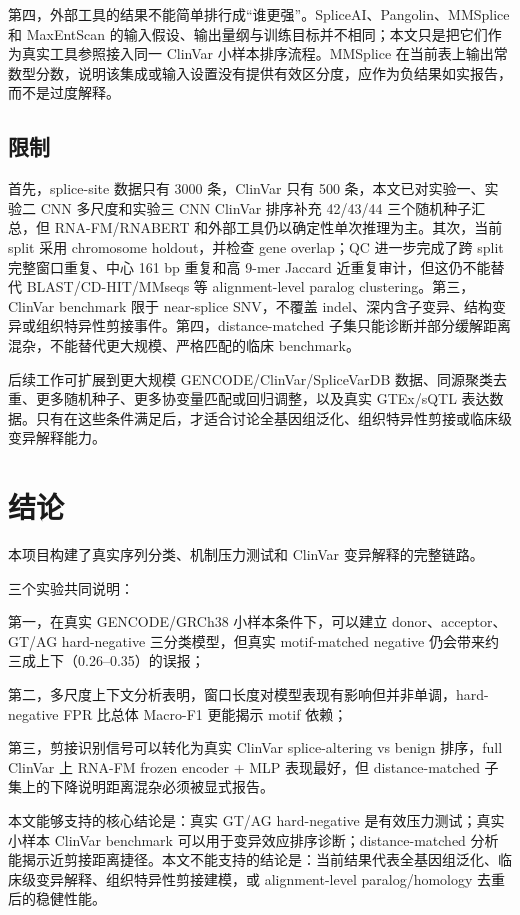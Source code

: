 \documentclass[
    oneside,
    fontset = win,
  ]{njuthesis}
\begin{document}
第四，外部工具的结果不能简单排行成“谁更强”。SpliceAI、Pangolin、MMSplice 和 MaxEntScan 的输入假设、输出量纲与训练目标并不相同；本文只是把它们作为真实工具参照接入同一 ClinVar 小样本排序流程。MMSplice 在当前表上输出常数型分数，说明该集成或输入设置没有提供有效区分度，应作为负结果如实报告，而不是过度解释。

\section{限制}

首先，splice-site 数据只有 3000 条，ClinVar 只有 500 条，本文已对实验一、实验二 CNN 多尺度和实验三 CNN ClinVar 排序补充 42/43/44 三个随机种子汇总，但 RNA-FM/RNABERT 和外部工具仍以确定性单次推理为主。其次，当前 split 采用 chromosome holdout，并检查 gene overlap；QC 进一步完成了跨 split 完整窗口重复、中心 161 bp 重复和高 9-mer Jaccard 近重复审计，但这仍不能替代 BLAST/CD-HIT/MMseqs 等 alignment-level paralog clustering。第三，ClinVar benchmark 限于 near-splice SNV，不覆盖 indel、深内含子变异、结构变异或组织特异性剪接事件。第四，distance-matched 子集只能诊断并部分缓解距离混杂，不能替代更大规模、严格匹配的临床 benchmark。

后续工作可扩展到更大规模 GENCODE/ClinVar/SpliceVarDB 数据、同源聚类去重、更多随机种子、更多协变量匹配或回归调整，以及真实 GTEx/sQTL 表达数据\cite{gtex2020}。只有在这些条件满足后，才适合讨论全基因组泛化、组织特异性剪接或临床级变异解释能力。

\chapter{结论}

本项目构建了真实序列分类、机制压力测试和 ClinVar 变异解释的完整链路。

三个实验共同说明：

第一，在真实 GENCODE/GRCh38 小样本条件下，可以建立 donor、acceptor、GT/AG hard-negative 三分类模型，但真实 motif-matched negative 仍会带来约三成上下（0.26--0.35）的误报；

第二，多尺度上下文分析表明，窗口长度对模型表现有影响但并非单调，hard-negative FPR 比总体 Macro-F1 更能揭示 motif 依赖；

第三，剪接识别信号可以转化为真实 ClinVar splice-altering vs benign 排序，full ClinVar 上 RNA-FM frozen encoder + MLP 表现最好，但 distance-matched 子集上的下降说明距离混杂必须被显式报告。

本文能够支持的核心结论是：真实 GT/AG hard-negative 是有效压力测试；真实小样本 ClinVar benchmark 可以用于变异效应排序诊断；distance-matched 分析能揭示近剪接距离捷径。本文不能支持的结论是：当前结果代表全基因组泛化、临床级变异解释、组织特异性剪接建模，或 alignment-level paralog/homology 去重后的稳健性能。
\end{document}
